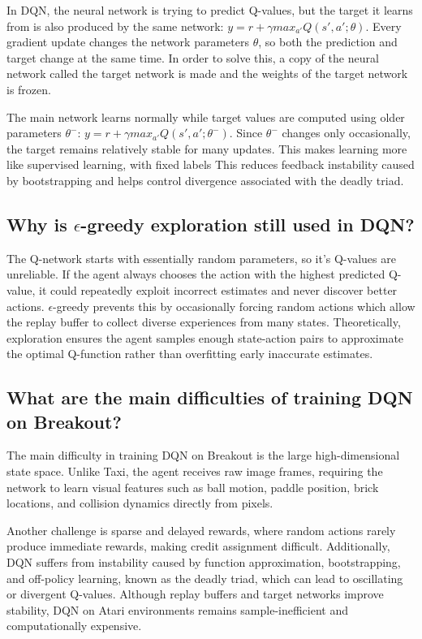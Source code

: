 \documentclass[11pt]{article}
\begin{document}
In DQN, the neural network is trying to predict Q-values, but the target it learns from is also produced by the same network: $y = r + \gamma max_{a'} Q(s',a';\theta)$. Every gradient update changes the network parameters $\theta$, so both the prediction and target change at the same time. In order to solve this, a copy of the neural network called the target network is made and the weights of the target network is frozen.

The main network learns normally while target values are computed using older parameters $\theta^-$: $y = r + \gamma max_{a'} Q(s',a';\theta^-)$. Since $\theta^-$ changes only occasionally, the target remains relatively stable for many updates. This makes learning more like supervised learning, with fixed labels This reduces feedback instability caused by bootstrapping and helps control divergence associated with the deadly triad.

\subsection*{Why is $\epsilon$-greedy exploration still used in DQN?}

The Q-network starts with essentially random parameters, so it's Q-values are unreliable. If the agent always chooses the action with the highest predicted Q-value, it could repeatedly exploit incorrect estimates and never discover better actions. $\epsilon$-greedy prevents this by occasionally forcing random actions which allow the replay buffer to collect diverse experiences from many states. Theoretically, exploration ensures the agent samples enough state-action pairs to approximate the optimal Q-function rather than overfitting early inaccurate estimates.

\subsection*{What are the main difficulties of training DQN on Breakout?}

The main difficulty in training DQN on Breakout is the large high-dimensional state space. Unlike Taxi, the agent receives raw image frames, requiring the network to learn visual features such as ball motion, paddle position, brick locations, and collision dynamics directly from pixels.

Another challenge is sparse and delayed rewards, where random actions rarely produce immediate rewards, making credit assignment difficult. Additionally, DQN suffers from instability caused by function approximation, bootstrapping, and off-policy learning, known as the deadly triad, which can lead to oscillating or divergent Q-values. Although replay buffers and target networks improve stability, DQN on Atari environments remains sample-inefficient and computationally expensive.
\end{document}
